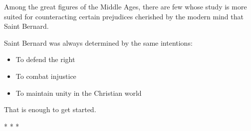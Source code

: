 \begin{quotationx}
Among the great figures of the Middle Ages, there are few whose study is more suited for counteracting certain prejudices cherished by the modern mind that Saint Bernard.

Saint Bernard was always determined by the same intentions:

\begin{itemize}


\item To defend the right

\item To combat injustice

\item To maintain unity in the Christian world
\end{itemize}
\end{quotationx}


That is enough to get started.



\begin{center}* * *\end{center}

